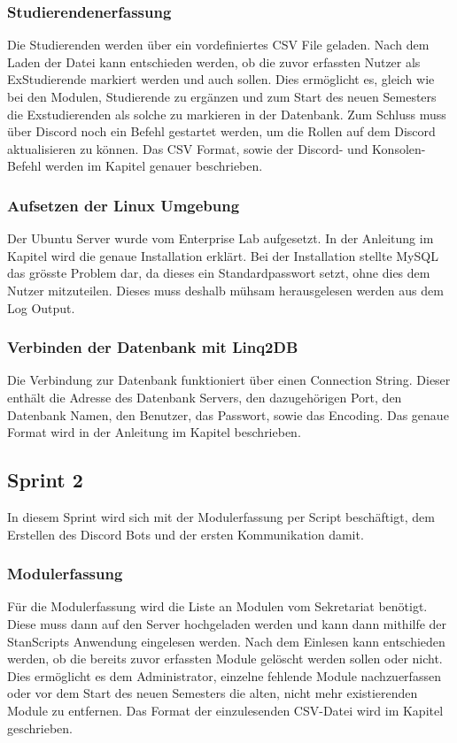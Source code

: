 \documentclass[a4paper, table]{article}
\begin{document}
\subsubsection{Studierendenerfassung}
Die Studierenden werden über ein vordefiniertes \gls{CSV} File geladen. 
Nach dem Laden der Datei kann entschieden werden, ob die zuvor erfassten Nutzer als ExStudierende markiert werden und auch sollen. 
Dies ermöglicht es, gleich wie bei den Modulen, Studierende zu ergänzen und zum Start des neuen Semesters die Exstudierenden als solche zu markieren in der Datenbank. 
Zum Schluss muss über Discord noch ein Befehl gestartet werden, um die Rollen auf dem Discord aktualisieren zu können. 
Das \gls{CSV} Format, sowie der Discord- und Konsolen-Befehl werden im Kapitel  genauer beschrieben.

\subsubsection{Aufsetzen der Linux Umgebung}
Der Ubuntu Server wurde vom Enterprise Lab aufgesetzt. 
In der Anleitung im Kapitel  wird die genaue Installation erklärt. 
Bei der Installation stellte MySQL das grösste Problem dar, da dieses ein Standardpasswort setzt, ohne dies dem Nutzer mitzuteilen. 
Dieses muss deshalb mühsam herausgelesen werden aus dem Log Output.

\subsubsection{Verbinden der Datenbank mit Linq2DB}
Die Verbindung zur Datenbank funktioniert über einen Connection String. 
Dieser enthält die Adresse des Datenbank Servers, den dazugehörigen Port, den Datenbank Namen, den Benutzer, das Passwort, sowie das Encoding. 
Das genaue Format wird in der Anleitung im Kapitel  beschrieben.

\newpage
\subsection{Sprint 2}
In diesem Sprint wird sich mit der Modulerfassung per Script beschäftigt,
dem Erstellen des Discord Bots und der ersten Kommunikation damit.

\subsubsection{Modulerfassung}
Für die Modulerfassung wird die Liste an Modulen vom Sekretariat benötigt. 
Diese muss dann auf den Server hochgeladen werden und kann dann mithilfe der StanScripts Anwendung eingelesen werden. 
Nach dem Einlesen kann entschieden werden, ob die bereits zuvor erfassten Module gelöscht werden sollen oder nicht. 
Dies ermöglicht es dem Administrator, einzelne fehlende Module nachzuerfassen oder vor dem Start des neuen Semesters die alten, nicht mehr existierenden Module zu entfernen. 
Das Format der einzulesenden \gls{CSV}-Datei wird im Kapitel  geschrieben.
\end{document}
